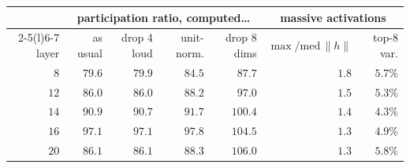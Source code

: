 \begin{tabular}{@{}rrrrrrr@{}}
\toprule
& \multicolumn{4}{c}{participation ratio, computed\ldots} & \multicolumn{2}{c}{massive activations} \\
\cmidrule(lr){2-5}\cmidrule(l){6-7}
layer & as usual & drop 4 loud & unit-norm. & drop 8 dims & $\max/\mathrm{med}\,\|h\|$ & top-8 var. \\
\midrule
$8$ & $79.6$ & $79.9$ & $84.5$ & $87.7$ & $1.8$ & $5.7\%$ \\
$12$ & $86.0$ & $86.0$ & $88.2$ & $97.0$ & $1.5$ & $5.3\%$ \\
$14$ & $90.9$ & $90.7$ & $91.7$ & $100.4$ & $1.4$ & $4.3\%$ \\
$16$ & $97.1$ & $97.1$ & $97.8$ & $104.5$ & $1.3$ & $4.9\%$ \\
$20$ & $86.1$ & $86.1$ & $88.3$ & $106.0$ & $1.3$ & $5.8\%$ \\
\bottomrule
\end{tabular}
